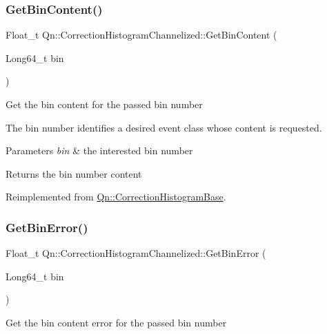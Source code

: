 \subsubsection{\texorpdfstring{Get\+Bin\+Content()}{GetBinContent()}}
{\footnotesize\ttfamily Float\+\_\+t Qn\+::\+Correction\+Histogram\+Channelized\+::\+Get\+Bin\+Content (\begin{DoxyParamCaption}\item[{Long64\+\_\+t}]{bin }\end{DoxyParamCaption})\hspace{0.3cm}{\ttfamily [virtual]}}

Get the bin content for the passed bin number

The bin number identifies a desired event class whose content is requested.


\begin{DoxyParams}{Parameters}
{\em bin} & the interested bin number \\
\hline
\end{DoxyParams}
\begin{DoxyReturn}{Returns}
the bin number content 
\end{DoxyReturn}


Reimplemented from \mbox{\hyperlink{classQn_1_1CorrectionHistogramBase_a9e4e745a6f4cbebf5b9277d6d63bc9c7}{Qn\+::\+Correction\+Histogram\+Base}}.

\mbox{\label{classQn_1_1CorrectionHistogramChannelized_a5982f9fa3ce2eb199cfdd2e518c4cb4e}} 
\subsubsection{\texorpdfstring{Get\+Bin\+Error()}{GetBinError()}}
{\footnotesize\ttfamily Float\+\_\+t Qn\+::\+Correction\+Histogram\+Channelized\+::\+Get\+Bin\+Error (\begin{DoxyParamCaption}\item[{Long64\+\_\+t}]{bin }\end{DoxyParamCaption})\hspace{0.3cm}{\ttfamily [virtual]}}

Get the bin content error for the passed bin number

